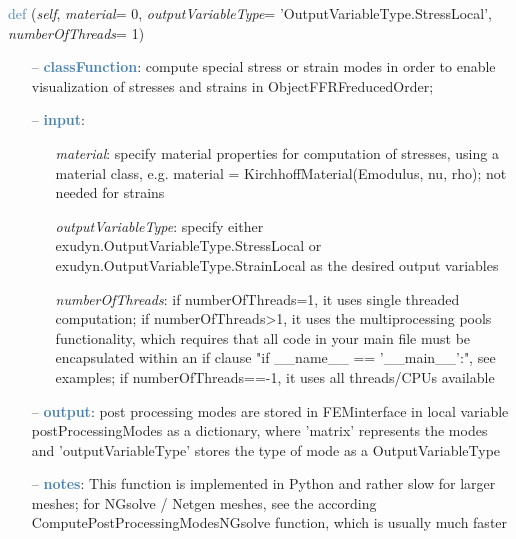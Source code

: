\begin{itemize}[leftmargin=1.4cm]
\begin{itemize}[leftmargin=0.5cm]
\begin{itemize}[leftmargin=1.4cm]
\begin{itemize}[leftmargin=1.4cm]
\begin{itemize}[leftmargin=0.5cm]
\begin{flushleft}
\noindent \textcolor{steelblue}{def {\bf {}}}\label{sec:FEM:FEMinterface:ComputePostProcessingModes}
({\it self}, {\it material}= 0, {\it outputVariableType}= 'OutputVariableType.StressLocal', {\it numberOfThreads}= 1)
\end{flushleft}
\setlength{\itemindent}{0.7cm}
\begin{itemize}[leftmargin=0.7cm]
  \item[--]  \textcolor{steelblue}{\bf classFunction}: compute special stress or strain modes in order to enable visualization of stresses and strains in ObjectFFRFreducedOrder;  \item[--]  \textcolor{steelblue}{\bf input}: \vspace{-6pt}
  \begin{itemize}[leftmargin=1.2cm]
\setlength{\itemindent}{-0.7cm}
    \item[] {\it material}: specify material properties for computation of stresses, using a material class, e.g. material = KirchhoffMaterial(Emodulus, nu, rho); not needed for strains
    \item[] {\it   outputVariableType}: specify either exudyn.OutputVariableType.StressLocal or exudyn.OutputVariableType.StrainLocal as the desired output variables
    \item[] {\it   numberOfThreads}: if numberOfThreads=1, it uses single threaded computation; if numberOfThreads>1, it uses the multiprocessing pools functionality, which requires that all code in your main file must be encapsulated within an if clause "if \_\_name\_\_ == '\_\_main\_\_':", see examples; if numberOfThreads==-1, it uses all threads/CPUs available
  \end{itemize}
  \item[--]  \textcolor{steelblue}{\bf output}: post processing modes are stored in FEMinterface in local variable postProcessingModes as a dictionary, where 'matrix' represents the modes and 'outputVariableType' stores the type of mode as a OutputVariableType  \item[--]  \textcolor{steelblue}{\bf notes}: This function is implemented in Python and rather slow for larger meshes; for NGsolve / Netgen meshes, see the according ComputePostProcessingModesNGsolve function, which is usually much faster\vspace{12pt}\end{itemize}

\end{itemize}
\end{itemize}
\end{itemize}
\end{itemize}
\end{itemize}
